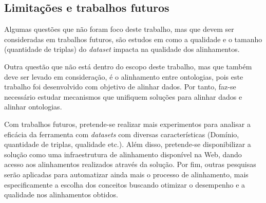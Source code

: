 \subsection{Limitações e trabalhos futuros}

Algumas questões que não foram foco deste trabalho, mas que devem ser consideradas em trabalhos futuros, são estudos em como a qualidade e o tamanho (quantidade de triplas) do \textit{dataset} impacta na qualidade dos alinhamentos.

Outra questão que não está dentro do escopo deste trabalho, mas que também deve ser levado em consideração, é o alinhamento entre ontologias, pois este trabalho foi desenvolvido com objetivo de alinhar dados. Por tanto, faz-se necessário estudar mecanismos que unifiquem soluções para alinhar dados e alinhar ontologias.

Com trabalhos futuros, pretende-se realizar mais experimentos para analisar a eficácia da ferramenta com \textit{datasets} com diversas características (Domínio, quantidade de triplas, qualidade etc.). Além disso, pretende-se disponibilizar a solução como uma infraestrutura de alinhamento disponível na Web, dando acesso aos alinhamentos realizados através da solução. Por fim, outras pesquisas serão aplicadas para automatizar ainda mais o processo de alinhamento, mais especificamente a escolha dos conceitos buscando otimizar o desempenho e a qualidade nos alinhamentos obtidos.
